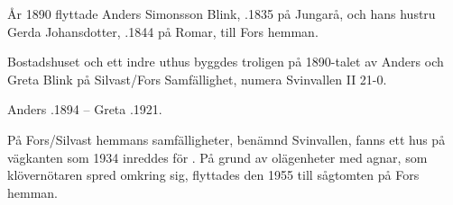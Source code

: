 År 1890 flyttade Anders Simonsson Blink, .1835 på Jungarå, och hans hustru Gerda Johansdotter, .1844 på Romar, till Fors hemman.
\begin{jhchildren}
  \item {}
  \item {}
  \item {}
  \item {}
\end{jhchildren}
Bostadshuset och ett indre uthus byggdes troligen på 1890-talet av Anders och Greta Blink på Silvast/Fors Samfällighet, numera Svinvallen	II 21-0.

Anders .1894  --  Greta .1921.


På Fors/Silvast hemmans samfälligheter, benämnd Svinvallen, fanns ett hus på vägkanten som 1934 inreddes för . På grund av olägenheter med agnar, som klövernötaren spred omkring sig, flyttades den 1955 till sågtomten på Fors hemman.
